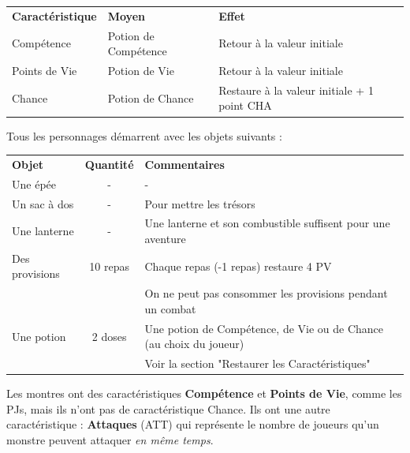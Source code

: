 \begin{frame}[b]
{}{

\vspace{0.1cm}

\begin{tabular}{llp{3cm}}
\textbf{Caractéristique} & \textbf{Moyen} & \textbf{Effet} \\
Compétence       & Potion de Compétence  & Retour à la valeur initiale \\
Points de Vie    & Potion de Vie         & Retour à la valeur initiale \\
Chance           & Potion de Chance      & Restaure à la valeur initiale + 1 point CHA \\
\end{tabular}


Tous les personnages démarrent avec les objets suivants :

\vspace{0.2cm}

\begin{tabular}{lcp{5cm}}
\textbf{Objet}        & \textbf{Quantité}  & \textbf{Commentaires} \\
Une épée       & - & - \\
Un sac à dos   & - & Pour mettre les trésors \\
Une lanterne   & - & Une lanterne et son combustible suffisent pour une aventure \\
Des provisions & 10 repas & Chaque repas (-1 repas) restaure 4 PV \\
               &          & On ne peut pas consommer les provisions pendant un combat \\
Une potion     & 2 doses  & Une potion de Compétence, de Vie ou de Chance (au choix du joueur) \\
               &          & Voir la section "Restaurer les Caractéristiques" \\
\end{tabular}



Les montres ont des caractéristiques \textbf{Compétence} et \textbf{Points de Vie}, comme les PJs, mais ils n'ont pas de caractéristique Chance. Ils ont une autre caractéristique : \textbf{Attaques} (ATT) qui représente le nombre de joueurs qu'un monstre peuvent attaquer \textit{en même temps}.

}
\end{frame}
